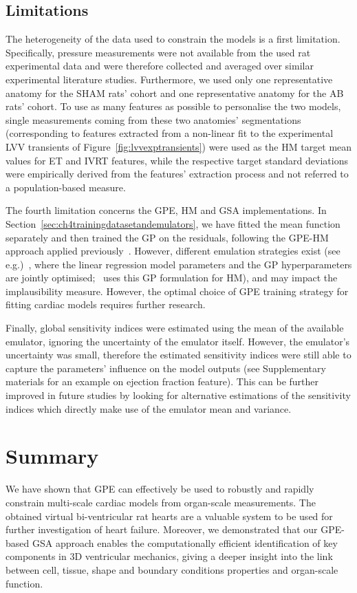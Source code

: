 \subsection{Limitations}\label{sec:ch4limitations}
The heterogeneity of the data used to constrain the models is a first limitation. Specifically, pressure measurements were not available from the used rat experimental data and were therefore collected and averaged over similar experimental literature studies. Furthermore, we used only one representative anatomy for the SHAM rats' cohort and one representative anatomy for the AB rats' cohort. To use as many features as possible to personalise the two models, single measurements coming from these two anatomies' segmentations (corresponding to features extracted from a non-linear fit to the experimental LVV transients of Figure~\ref{fig:lvvexptransients}) were used as the HM target mean values for ET and IVRT features, while the respective target standard deviations were empirically derived from the features' extraction process and not referred to a population-based measure. 

\vspace{0.2cm}
The fourth limitation concerns the GPE, HM and GSA implementations. In Section~\ref{sec:ch4trainingdatasetandemulators}, we have fitted the mean function separately and then trained the GP on the residuals, following the GPE-HM approach applied previously~\cite{Salter:2016,Vernon:2018}. However, diffe{}rent emulation strategies exist (see e.g.)~\cite{Oakley:2004}, where the linear regression model parameters and the GP hyperparameters are jointly optimised;~\cite{Coveney:2018} uses this GP formulation for HM), and may impact the implausibility measure. However, the optimal choice of GPE training strategy for fitting cardiac models requires further research.

\vspace{0.2cm}
Finally, global sensitivity indices were estimated using the mean of the available emulator, ignoring the uncertainty of the emulator itself. However, the emulator's uncertainty was small, therefore the estimated sensitivity indices were still able to capture the parameters' influence on the model outputs (see Supplementary materials for an example on ejection fraction feature). This can be further improved in future studies by looking for alternative estimations of the sensitivity indices which directly make use of the emulator mean and variance.


%
%
%
\section{Summary}\label{sec:ch4summary}
We have shown that GPE can effectively be used to robustly and rapidly constrain multi-scale cardiac models from organ-scale measurements. The obtained virtual bi-ventricular rat hearts are a valuable system to be used for further investigation of heart failure. Moreover, we demonstrated that our GPE-based GSA approach enables the computationally efficient identification of key components in 3D ventricular mechanics, giving a deeper insight into the link between cell, tissue, shape and boundary conditions properties and organ-scale function.